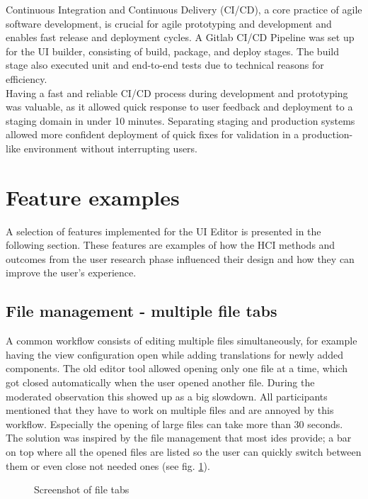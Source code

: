 Continuous Integration and Continuous Delivery (CI/CD), a core practice of agile software development, is crucial for agile prototyping and development and enables fast release and deployment cycles.
A Gitlab CI/CD Pipeline was set up for the UI builder, consisting of build, package, and deploy stages.
The build stage also executed unit and end-to-end tests due to technical reasons for efficiency.\\
Having a fast and reliable CI/CD process during development and prototyping was valuable, as it allowed quick response to user feedback and deployment to a staging domain in under 10 minutes.
Separating staging and production systems allowed more confident deployment of quick fixes for validation in a production-like environment without interrupting users.

\section{Feature examples}

A selection of features implemented for the UI Editor is presented in the following section.
These features are examples of how the HCI methods and outcomes from the user research phase influenced their design and how they can improve the user's experience. 

\subsection{File management - multiple file tabs}

A common workflow consists of editing multiple files simultaneously, for example having the view configuration open while adding translations for newly added components.
The old editor tool allowed opening only one file at a time, which got closed automatically when the user opened another file.
During the moderated observation this showed up as a big slowdown.
All participants mentioned that they have to work on multiple files and are annoyed by this workflow.
Especially the opening of large files can take more than 30 seconds.
\\
The solution was inspired by the file management that most \Gls{ide}s provide; a bar on top where all the opened files are listed so the user can quickly switch between them or even close not needed ones (see fig. \ref{fig:file-tabs}). 

\begin{figure}[h!]
  \caption{Screenshot of file tabs}
  \label{fig:file-tabs}
\end{figure}

